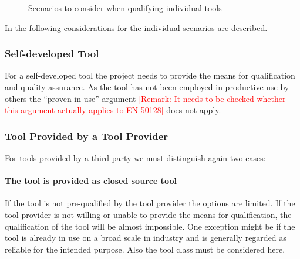 \begin{figure}[htbp]
\begin{center}
\end{center}
\caption{Scenarios to consider when qualifying individual tools}
\label{fig:tool-qualification-scenarios}
\end{figure}

In the following considerations for the individual scenarios are described.

\subsubsection{Self-developed Tool}

For a self-developed tool the project needs to provide the means for qualification and quality assurance. As the tool has not been employed in productive use by others the ``proven in use'' argument \textcolor{red}{[Remark: It needs to be checked whether this argument actually applies to EN 50128]} does not apply.

\subsubsection{Tool Provided by a Tool Provider}

For tools provided by a third party we must distinguish again two cases:

\paragraph{The tool is provided as closed source tool}

If the tool is not pre-qualified by the tool provider the options are limited. If the tool provider is not willing or unable to provide the means for qualification, the qualification of the tool will be almost impossible. One exception might be if the tool is already in use on a broad scale in industry and is generally regarded as reliable for the intended purpose. Also the tool class must be considered here.


